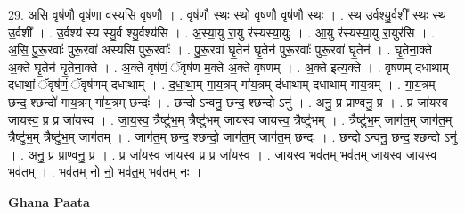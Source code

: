 \documentclass[17pt]{extarticle}
\begin{document}
29. अ॒सि॒ वृष॑णौ॒ वृष॑णा वस्यसि॒ वृष॑णौ । . वृष॑णौ स्थः स्थो॒ वृष॑णौ॒ वृष॑णौ स्थः । . स्थ॒ उ॒र्वश्यु॒र्वशी᳚ स्थः स्थ उ॒र्वशी᳚ । . उ॒र्वश्य॑ स्य स्यु॒र्व श्यु॒र्वश्य॑सि । . अ॒स्या॒यु रा॒यु र॑स्यस्या॒युः । . आ॒यु र॑स्यस्या॒यु रा॒युर॑सि । . अ॒सि॒ पु॒रू॒रवाः᳚ पुरू॒रवा॑ अस्यसि पुरू॒रवाः᳚ । . पु॒रू॒रवा॑ घृ॒तेन॑ घृ॒तेन॑ पुरू॒रवाः᳚ पुरू॒रवा॑ घृ॒तेन॑ । . घृ॒तेना॒क्ते अ॒क्ते घृ॒तेन॑ घृ॒तेना॒क्ते । . अ॒क्ते वृष॑णं॒ ॅवृष॑ण म॒क्ते अ॒क्ते वृष॑णम् । . अ॒क्ते इत्य॒क्ते । . वृष॑णम् दधाथाम् दधाथां॒ ॅवृष॑णं॒ ॅवृष॑णम् दधाथाम् । . द॒धा॒था॒म् गा॒य॒त्रम् गा॑य॒त्रम् द॑धाथाम् दधाथाम् गाय॒त्रम् । . गा॒य॒त्रम् छन्द॒ श्छन्दो॑ गाय॒त्रम् गा॑य॒त्रम् छन्दः॑ । . छन्दो ऽन्वनु॒ छन्द॒ श्छन्दो ऽनु॑ । . अनु॒ प्र प्राण्वनु॒ प्र । . प्र जा॑यस्व जायस्व॒ प्र प्र जा॑यस्व । . जा॒य॒स्व॒ त्रैष्टु॑भ॒म् त्रैष्टु॑भम् जायस्व जायस्व॒ त्रैष्टु॑भम् । . त्रैष्टु॑भ॒म् जाग॑त॒म् जाग॑त॒म् त्रैष्टु॑भ॒म् त्रैष्टु॑भ॒म् जाग॑तम् । . जाग॑त॒म् छन्द॒ श्छन्दो॒ जाग॑त॒म् जाग॑त॒म् छन्दः॑ । . छन्दो ऽन्वनु॒ छन्द॒ श्छन्दो ऽनु॑ । . अनु॒ प्र प्राण्वनु॒ प्र । . प्र जा॑यस्व जायस्व॒ प्र प्र जा॑यस्व । . जा॒य॒स्व॒ भव॑त॒म् भव॑तम् जायस्व जायस्व॒ भव॑तम् । . भव॑तम् नो नो॒ भव॑त॒म् भव॑तम् नः । \newline

\textbf{Ghana Paata } \newline
\end{document}

